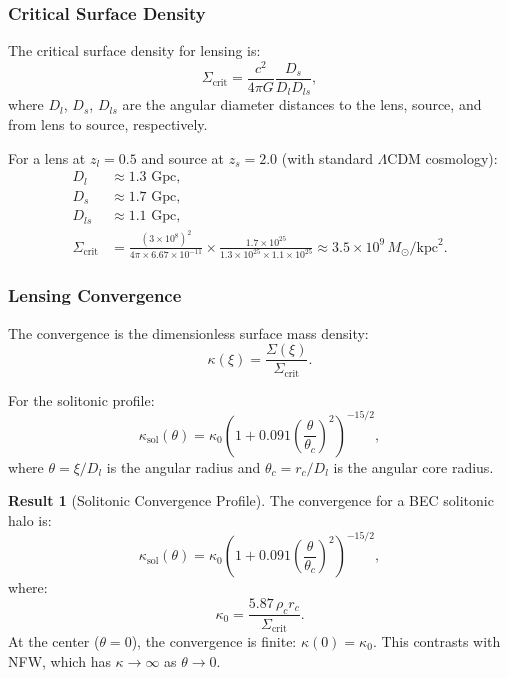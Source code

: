 \documentclass[11pt,a4paper]{article}
\newcommand{\ee}[1]{\times 10^{#1}}
\newcommand{\kpc}{\ensuremath{\mathrm{kpc}}}
\theoremstyle{definition}
\newtheorem{result}{Result}[section]
\theoremstyle{remark}
\begin{document}
\subsubsection{Critical Surface Density}

The critical surface density for lensing is:
\begin{equation}
\label{eq:sigma_crit}
\Sigma_{\mathrm{crit}} = \frac{c^2}{4\pi G} \frac{D_s}{D_l D_{ls}},
\end{equation}
where $D_l$, $D_s$, $D_{ls}$ are the angular diameter distances to the lens, source, and from lens to source, respectively.

For a lens at $z_l = 0.5$ and source at $z_s = 2.0$ (with standard $\Lambda$CDM cosmology):
\begin{align}
D_l &\approx 1.3 \text{ Gpc}, \\
D_s &\approx 1.7 \text{ Gpc}, \\
D_{ls} &\approx 1.1 \text{ Gpc}, \\
\Sigma_{\mathrm{crit}} &= \frac{(3 \ee{8})^2}{4\pi \times 6.67 \ee{-11}} \times \frac{1.7 \ee{25}}{1.3 \ee{25} \times 1.1 \ee{25}} \approx 3.5 \ee{9} \, M_\odot/\kpc^2.
\end{align}

\subsubsection{Lensing Convergence}

The convergence is the dimensionless surface mass density:
\begin{equation}
\label{eq:convergence_def}
\kappa(\xi) = \frac{\Sigma(\xi)}{\Sigma_{\mathrm{crit}}}.
\end{equation}

For the solitonic profile:
\begin{equation}
\label{eq:kappa_soliton}
\boxed{\kappa_{\mathrm{sol}}(\theta) = \kappa_0 \left(1 + 0.091 \left(\frac{\theta}{\theta_c}\right)^2\right)^{-15/2},}
\end{equation}
where $\theta = \xi/D_l$ is the angular radius and $\theta_c = r_c/D_l$ is the angular core radius.

\begin{result}[Solitonic Convergence Profile]
The convergence for a BEC solitonic halo is:
\begin{equation}
\kappa_{\mathrm{sol}}(\theta) = \kappa_0 \left(1 + 0.091 \left(\frac{\theta}{\theta_c}\right)^2\right)^{-15/2},
\end{equation}
where:
\begin{equation}
\kappa_0 = \frac{5.87 \, \rho_c r_c}{\Sigma_{\mathrm{crit}}}.
\end{equation}
At the center ($\theta = 0$), the convergence is finite: $\kappa(0) = \kappa_0$. This contrasts with NFW, which has $\kappa \to \infty$ as $\theta \to 0$.
\end{result}
\end{document}
